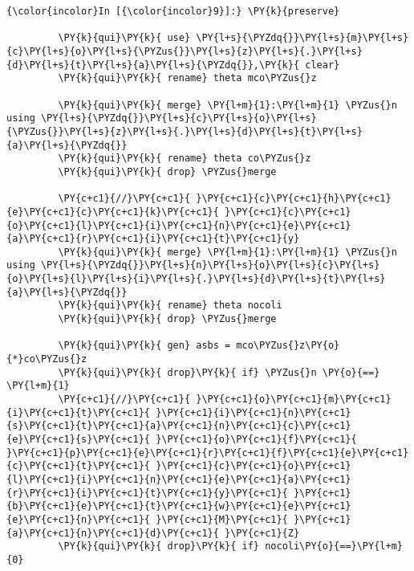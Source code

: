 \documentclass[11pt,notitlepage]{article}\usepackage[]{graphicx}\usepackage[]{color}
\makeatletter
\newenvironment{kframe}{%
 \def\at@end@of@kframe{}%
 \ifinner\ifhmode%
  \def\at@end@of@kframe{\end{minipage}}%
  \begin{minipage}{\columnwidth}%
 \fi\fi%
 \def\FrameCommand##1{\hskip\@totalleftmargin \hskip-\fboxsep
 \colorbox{shadecolor}{##1}\hskip-\fboxsep
     \hskip-\linewidth \hskip-\@totalleftmargin \hskip\columnwidth}%
 \MakeFramed {\advance\hsize-\width
   \@totalleftmargin\z@ \linewidth\hsize
   \@setminipage}}%
 {\par\unskip\endMakeFramed%
 \at@end@of@kframe}
\newenvironment{knitrout}{}{} %
\makeatother
\begin{document}
\begin{enumerate}[a)]
\begin{knitrout}
\color{fgcolor}\begin{kframe}
   \begin{Verbatim}[commandchars=\\\{\}]
{\color{incolor}In [{\color{incolor}9}]:} \PY{k}{preserve}	 
         
         \PY{k}{qui}\PY{k}{ use} \PY{l+s}{\PYZdq{}}\PY{l+s}{m}\PY{l+s}{c}\PY{l+s}{o}\PY{l+s}{\PYZus{}}\PY{l+s}{z}\PY{l+s}{.}\PY{l+s}{d}\PY{l+s}{t}\PY{l+s}{a}\PY{l+s}{\PYZdq{}},\PY{k}{ clear}
         \PY{k}{qui}\PY{k}{ rename} theta mco\PYZus{}z 
         
         \PY{k}{qui}\PY{k}{ merge} \PY{l+m}{1}:\PY{l+m}{1} \PYZus{}n using \PY{l+s}{\PYZdq{}}\PY{l+s}{c}\PY{l+s}{o}\PY{l+s}{\PYZus{}}\PY{l+s}{z}\PY{l+s}{.}\PY{l+s}{d}\PY{l+s}{t}\PY{l+s}{a}\PY{l+s}{\PYZdq{}}
         \PY{k}{qui}\PY{k}{ rename} theta co\PYZus{}z 
         \PY{k}{qui}\PY{k}{ drop} \PYZus{}merge 
         
         \PY{c+c1}{//}\PY{c+c1}{ }\PY{c+c1}{c}\PY{c+c1}{h}\PY{c+c1}{e}\PY{c+c1}{c}\PY{c+c1}{k}\PY{c+c1}{ }\PY{c+c1}{c}\PY{c+c1}{o}\PY{c+c1}{l}\PY{c+c1}{i}\PY{c+c1}{n}\PY{c+c1}{e}\PY{c+c1}{a}\PY{c+c1}{r}\PY{c+c1}{i}\PY{c+c1}{t}\PY{c+c1}{y}
         \PY{k}{qui}\PY{k}{ merge} \PY{l+m}{1}:\PY{l+m}{1} \PYZus{}n using \PY{l+s}{\PYZdq{}}\PY{l+s}{n}\PY{l+s}{o}\PY{l+s}{c}\PY{l+s}{o}\PY{l+s}{l}\PY{l+s}{i}\PY{l+s}{.}\PY{l+s}{d}\PY{l+s}{t}\PY{l+s}{a}\PY{l+s}{\PYZdq{}}
         \PY{k}{qui}\PY{k}{ rename} theta nocoli
         \PY{k}{qui}\PY{k}{ drop} \PYZus{}merge
         
         \PY{k}{qui}\PY{k}{ gen} asbs = mco\PYZus{}z\PY{o}{*}co\PYZus{}z
         \PY{k}{qui}\PY{k}{ drop}\PY{k}{ if} \PYZus{}n \PY{o}{==} \PY{l+m}{1} 
         \PY{c+c1}{//}\PY{c+c1}{ }\PY{c+c1}{o}\PY{c+c1}{m}\PY{c+c1}{i}\PY{c+c1}{t}\PY{c+c1}{ }\PY{c+c1}{i}\PY{c+c1}{n}\PY{c+c1}{s}\PY{c+c1}{t}\PY{c+c1}{a}\PY{c+c1}{n}\PY{c+c1}{c}\PY{c+c1}{e}\PY{c+c1}{s}\PY{c+c1}{ }\PY{c+c1}{o}\PY{c+c1}{f}\PY{c+c1}{ }\PY{c+c1}{p}\PY{c+c1}{e}\PY{c+c1}{r}\PY{c+c1}{f}\PY{c+c1}{e}\PY{c+c1}{c}\PY{c+c1}{t}\PY{c+c1}{ }\PY{c+c1}{c}\PY{c+c1}{o}\PY{c+c1}{l}\PY{c+c1}{i}\PY{c+c1}{n}\PY{c+c1}{e}\PY{c+c1}{a}\PY{c+c1}{r}\PY{c+c1}{i}\PY{c+c1}{t}\PY{c+c1}{y}\PY{c+c1}{ }\PY{c+c1}{b}\PY{c+c1}{e}\PY{c+c1}{t}\PY{c+c1}{w}\PY{c+c1}{e}\PY{c+c1}{e}\PY{c+c1}{n}\PY{c+c1}{ }\PY{c+c1}{M}\PY{c+c1}{ }\PY{c+c1}{a}\PY{c+c1}{n}\PY{c+c1}{d}\PY{c+c1}{ }\PY{c+c1}{Z}
         \PY{k}{qui}\PY{k}{ drop}\PY{k}{ if} nocoli\PY{o}{==}\PY{l+m}{0}
         

\end{Verbatim}
\end{kframe}
\end{knitrout}
\end{enumerate}
\end{document}
